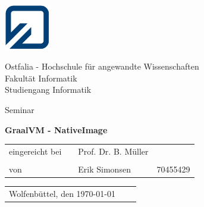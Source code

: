 \begin{minipage}{2.1cm}
	\includegraphics[width=2cm]{resources/fh_logo_klein.jpg}
\end{minipage}
\begin{minipage}{10.0cm}
	Ostfalia - Hochschule für angewandte Wissenschaften\\
	Fakultät Informatik\\
	Studiengang Informatik
\end{minipage}

\vspace{35mm}

\begin{center}
	{\LARGE Seminar}\\[10mm]
\end{center}

\begin{center}
	\LARGE \textbf{GraalVM - NativeImage\\[28mm]}
\end{center}

\begin{table}[h]
	\centering
	\hspace{50mm}\begin{tabular}{lcll}
		eingereicht bei &  & Prof. Dr. B. Müller &          \\
		                &  &                     &          \\
		von             &  & Erik Simonsen     	 & 70455429 \\
		        
	\end{tabular}
\end{table}

\vspace{30mm}

\begin{table}[h]
	\begin{tabular}{lll}
		Wolfenbüttel, den \today\\
	\end{tabular}
\end{table}
\clearpage
